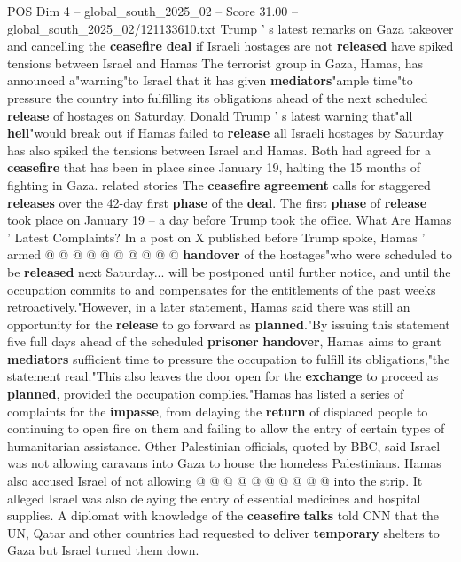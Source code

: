 \begin{textsample}{POS Dim 4 – global\_south\_2025\_02 – Score 31.00 – global\_south\_2025\_02/121133610.txt}  \label{ex:f4_pos_028}
Trump ' s latest remarks on Gaza takeover and cancelling the \textbf{ceasefire} \textbf{deal} if Israeli hostages are not \textbf{released} have spiked tensions between Israel and Hamas The terrorist group in Gaza, Hamas, has announced a"warning"to Israel that it has given \textbf{mediators}"ample time"to pressure the country into fulfilling its obligations ahead of the next scheduled \textbf{release} of hostages on Saturday.
Donald Trump ' s latest warning that"all \textbf{hell}"would break out if Hamas failed to \textbf{release} all Israeli hostages by Saturday has also spiked the tensions between Israel and Hamas.
Both had agreed for a \textbf{ceasefire} that has been in place since January 19, halting the 15 months of fighting in Gaza. related stories The \textbf{ceasefire} \textbf{agreement} calls for staggered \textbf{releases} over the 42-day first \textbf{phase} of the \textbf{deal}.
The first \textbf{phase} of \textbf{release} took place on January 19 -- a day before Trump took the office.
What Are Hamas ' Latest Complaints?
In a post on X published before Trump spoke, Hamas ' armed @ @ @ @ @ @ @ @ @ @ \textbf{handover} of the hostages"who were scheduled to be \textbf{released} next Saturday... will be postponed until further notice, and until the occupation commits to and compensates for the entitlements of the past weeks retroactively."However, in a later statement, Hamas said there was still an opportunity for the \textbf{release} to go forward as \textbf{planned}."By issuing this statement five full days ahead of the scheduled \textbf{prisoner} \textbf{handover}, Hamas aims to grant \textbf{mediators} sufficient time to pressure the occupation to fulfill its obligations,"the statement read."This also leaves the door open for the \textbf{exchange} to proceed as \textbf{planned}, provided the occupation complies."Hamas has listed a series of complaints for the \textbf{impasse}, from delaying the \textbf{return} of displaced people to continuing to open fire on them and failing to allow the entry of certain types of humanitarian assistance.
Other Palestinian officials, quoted by BBC, said Israel was not allowing caravans into Gaza to house the homeless Palestinians.
Hamas also accused Israel of not allowing @ @ @ @ @ @ @ @ @ @ into the strip.
It alleged Israel was also delaying the entry of essential medicines and hospital supplies.
A diplomat with knowledge of the \textbf{ceasefire} \textbf{talks} told CNN that the UN, Qatar and other countries had requested to deliver \textbf{temporary} shelters to Gaza but Israel turned them down.

\end{textsample}
